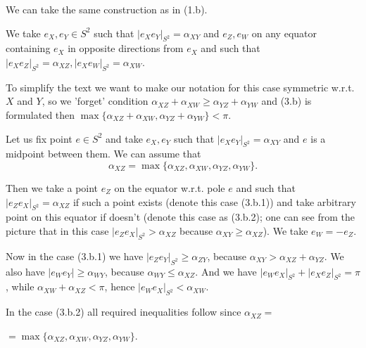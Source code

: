 \documentclass[a4paper,12pt]{article}
\theoremstyle{definition}
\theoremstyle{definition}
\theoremstyle{definition}
\begin{document}
     
    We can take the same construction as in (1.b).


We take  $e_X, e_Y\in S^2$       
        such that   $|e_Xe_Y|_{S^2}=\alpha_{XY}$ and
        $e_Z, e_W$ on any equator containing $e_X$
        in opposite directions from $e_X$ and such that 
 $|e_Xe_Z|_{S^2}=\alpha_{XZ},   
   |e_Xe_W|_{S^2}=\alpha_{XW}$.


To simplify the text we want to make our notation for this case
symmetric w.r.t. $X$ and $Y$, so we 'forget' condition
$\alpha_{XZ}+\alpha_{XW}\ge\alpha_{YZ}+\alpha_{YW}$
and (3.b) is formulated then
$\max\{\alpha_{XZ}+\alpha_{XW}, \alpha_{YZ}+\alpha_{YW}\}<\pi$.

Let us fix point $e\in S^2$
and take $e_X, e_Y$ such that $|e_Xe_Y|_{S^2}=\alpha_{XY}$ and $e$ is a midpoint between them.
We can assume that $$\alpha_{XZ}=\max\{\alpha_{XZ}, \alpha_{XW}, 
\alpha_{YZ}, \alpha_{YW}\}.$$

 Then we take a point
$e_Z$ on the equator w.r.t. pole $e$ and such that $|e_Ze_X|_{S^2}=\alpha_{XZ}$
if such a point exists (denote this case (3.b.1)) and take arbitrary point on this equator if doesn't
 (denote this case as (3.b.2); one can see from the picture that in this
case $|e_Ze_X|_{S^2}>\alpha_{XZ}$ because $\alpha_{XY}\ge\alpha_{XZ}$).
We take $e_W=-e_Z$.

Now in the case (3.b.1)
we have $|e_Ze_Y|_{S^2}\ge\alpha_{ZY}$, because $\alpha_{XY}>\alpha_{XZ}+\alpha_{YZ}$.
We also have $|e_We_Y|\ge\alpha_{WY}$, because $\alpha_{WY}\le\alpha_{XZ}$.
And we have 
$|e_We_X|_{S^2}+|e_Xe_Z|_{S^2}=\pi$, while $\alpha_{XW}+\alpha_{XZ}<\pi$,
hence $|e_We_X|_{S^2}<\alpha_{XW}$.

In the case (3.b.2) all required inequalities follow since
 $\alpha_{XZ}=$
 
 \noindent
  $=\max\{\alpha_{XZ}, \alpha_{XW}, 
\alpha_{YZ}, \alpha_{YW}\}$.

        
   

  
\end{document}
